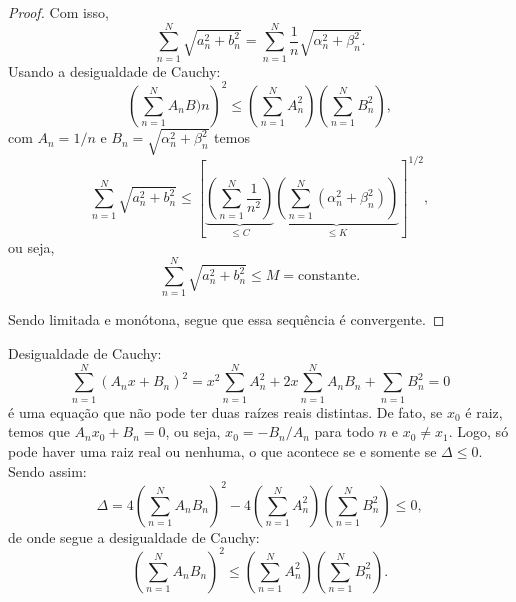 \begin{proof}
  Com isso,
  \begin{dmath*}
    \sum_{n = 1}^N \sqrt{a_n^2 + b_n^2} = \sum_{n = 1}^N \frac{1}{n}
    \sqrt{\alpha_n^2 + \beta_n^2}.
  \end{dmath*}
  Usando a desigualdade de Cauchy:
  \begin{dmath*}
    \left( \sum_{n = 1}^N A_n B)n \right)^2 \leq \left( \sum_{n = 1}^N A_n^2
    \right) \left( \sum_{n = 1}^N B_n^2 \right),
  \end{dmath*}
  com $A_n = 1 / n$ e $B_n = \sqrt{\alpha_n^2 + \beta_n^2}$ temos
  \begin{dmath*}
    \sum_{n = 1}^N \sqrt{a_n^2 + b_n^2} \leq \left[ \underbrace{\left( \sum_{n
    = 1}^N \frac{1}{n^2} \right)}_{\leq C} \underbrace{\left( \sum_{n = 1}^N
    \left( \alpha_n^2 + \beta_n^2 \right) \right)}_{\leq K} \right]^{1/2},
  \end{dmath*}
  ou seja,
  \begin{dmath*}
    \sum_{n = 1}^N \sqrt{a_n^2 + b_n^2} \leq M = \text{constante}.
  \end{dmath*}

  Sendo limitada e monótona, segue que essa sequência é convergente.
\end{proof}

\begin{obs}
  Desigualdade de Cauchy:
  \begin{dmath*}
    \sum_{n = 1}^N \left( A_n x + B_n \right)^2 = x^2 \sum_{n = 1}^N A_n^2 + 2 x
    \sum_{n = 1}^N A_n B_n + \sum_{n = 1} B_n^2 = 0
  \end{dmath*}
  é uma equação que não pode ter duas raízes reais distintas. De fato, se $x_0$
  é raiz, temos que $A_n x_0 + B_n = 0$, ou seja, $x_0 = - B_n / A_n$ para todo
  $n$ e $ x_0 \neq x_1$. Logo, só pode haver uma raiz real ou nenhuma, o que
  acontece se e somente se $\Delta \leq 0$. Sendo assim:
  \begin{dmath*}
    \Delta = 4 \left( \sum_{n = 1}^N A_n B_n \right)^2 - 4 \left( \sum_{n =
    1}^N A_n^2 \right) \left( \sum_{n = 1}^N B_n^2 \right) \leq 0,
  \end{dmath*}
  de onde segue a desigualdade de Cauchy:
  \begin{dmath*}
    \left( \sum_{n = 1}^N A_n B_n \right)^2 \leq \left( \sum_{n = 1}^N A_n^2
    \right) \left( \sum_{n = 1}^N B_n^2 \right).
  \end{dmath*}
\end{obs}


